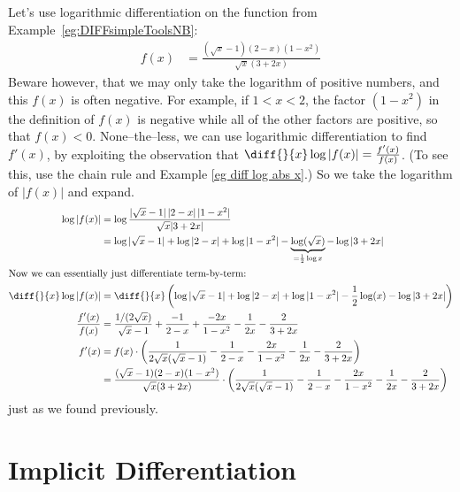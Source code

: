 \begin{eg}
Let's use logarithmic differentiation on the function from
Example~\ref{eg:DIFFsimpleToolsNB}:
\begin{align*}
f(x) &=\frac{(\sqrt{x}-1)(2-x)(1-x^2)}{\sqrt{x}(3+2x)}
\end{align*}
Beware however, that we may only take the logarithm of positive numbers,
and this $f(x)$ is often negative. For example, if $1<x<2$, the factor
$(1-x^2)$ in the definition of $f(x)$ is negative while all of the other factors are positive, so that $f(x)<0$. None--the--less, we can use logarithmic
differentiation to find $f'(x)$,  by exploiting the observation that
$\diff{}{x}\log|f(x)|=\frac{f'(x)}{f(x)}$. (To see this, use the chain rule and
Example \ref{eg diff log abs x}.) So we take the logarithm of $|f(x)|$ and expand.
\begin{align*}
\log |f(x)| &= \log \frac{|\sqrt{x}-1|\,|2-x|\,|1-x^2|}{\sqrt{x}|3+2x|} \\
  &= \log|\sqrt{x}-1| + \log|2-x| + \log|1-x^2| -
\underbrace{\log(\sqrt{x})}_{=\frac{1}{2}\log x} - \log|3+2x| \\
\intertext{Now we can essentially just differentiate term-by-term:}
\diff{}{x}\log |f(x)| &= \diff{}{x} \left(
  \log|\sqrt{x}-1| + \log|2-x| + \log|1-x^2| - \frac{1}{2}\log(x) - \log|3+2x|
 \right)\\
\frac{f'(x)}{f(x)} &= \frac{1/(2\sqrt{x})}{\sqrt{x}-1}
  + \frac{-1}{2-x} + \frac{-2x}{1-x^2} - \frac{1}{2x} - \frac{2}{3+2x} \\
f'(x) &= f(x) \cdot \left( \frac{1}{2 \sqrt{x} (\sqrt{x}-1)}
  - \frac{1}{2-x} - \frac{2x}{1-x^2} - \frac{1}{2x} - \frac{2}{3+2x}
\right)\\
  &= \frac{(\sqrt{x}-1)(2-x)(1-x^2)}{\sqrt{x}(3+2x)}
  \cdot \left( \frac{1}{2 \sqrt{x} (\sqrt{x}-1)}
  - \frac{1}{2-x} - \frac{2x}{1-x^2} - \frac{1}{2x} - \frac{2}{3+2x}
\right)
\end{align*}
just as we found previously.
\end{eg}


\section{Implicit Differentiation}


